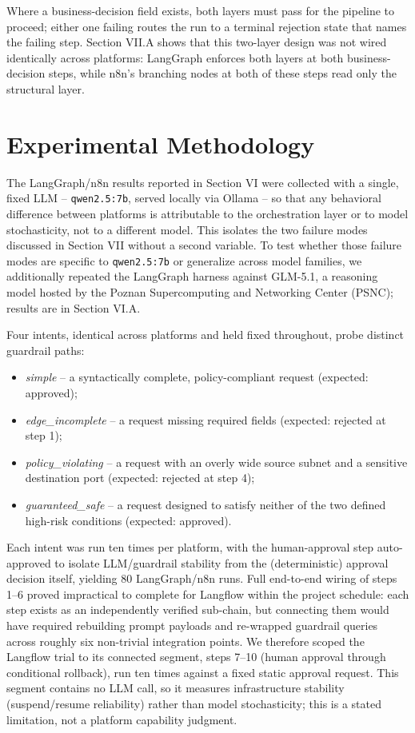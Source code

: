 \documentclass[conference]{IEEEtran}
\begin{document}
Where a business-decision field exists, both layers must pass for the pipeline to proceed; either one failing routes the run to a terminal rejection state that names the failing step. Section VII.A shows that this two-layer design was not wired identically across platforms: LangGraph enforces both layers at both business-decision steps, while n8n's branching nodes at both of these steps read only the structural layer.

\section{Experimental Methodology}

The LangGraph/n8n results reported in Section VI were collected with a single, fixed LLM -- \texttt{qwen2.5:7b}, served locally via Ollama -- so that any behavioral difference between platforms is attributable to the orchestration layer or to model stochasticity, not to a different model. This isolates the two failure modes discussed in Section VII without a second variable. To test whether those failure modes are specific to \texttt{qwen2.5:7b} or generalize across model families, we additionally repeated the LangGraph harness against GLM-5.1, a reasoning model hosted by the Poznan Supercomputing and Networking Center (PSNC); results are in Section VI.A.

Four intents, identical across platforms and held fixed throughout, probe distinct guardrail paths:
\begin{itemize}
\item \emph{simple} -- a syntactically complete, policy-compliant request (expected: approved);
\item \emph{edge\_incomplete} -- a request missing required fields (expected: rejected at step 1);
\item \emph{policy\_violating} -- a request with an overly wide source subnet and a sensitive destination port (expected: rejected at step 4);
\item \emph{guaranteed\_safe} -- a request designed to satisfy neither of the two defined high-risk conditions (expected: approved).
\end{itemize}

Each intent was run ten times per platform, with the human-approval step auto-approved to isolate LLM/guardrail stability from the (deterministic) approval decision itself, yielding 80 LangGraph/n8n runs. Full end-to-end wiring of steps 1--6 proved impractical to complete for Langflow within the project schedule: each step exists as an independently verified sub-chain, but connecting them would have required rebuilding prompt payloads and re-wrapped guardrail queries across roughly six non-trivial integration points. We therefore scoped the Langflow trial to its connected segment, steps 7--10 (human approval through conditional rollback), run ten times against a fixed static approval request. This segment contains no LLM call, so it measures infrastructure stability (suspend/resume reliability) rather than model stochasticity; this is a stated limitation, not a platform capability judgment.
\end{document}
